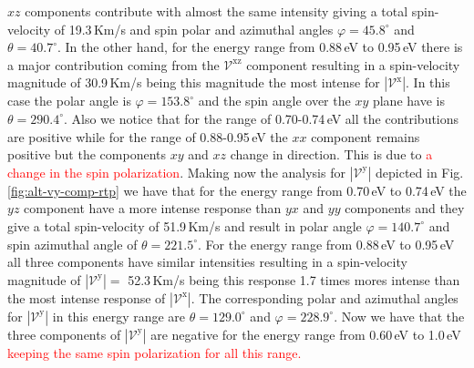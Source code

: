 \documentclass[prb,11pt,tightenlines,twocolumn,aps]{revtex4-1}
\begin{document}
$xz$ components contribute with almost the same intensity giving a total spin-
velocity of 19.3\,Km/s and spin polar and azimuthal angles $\varphi =
45.8^{\circ}$ and $\theta=40.7^{\circ}$.
%
In the other hand, for the energy range from 0.88\,eV to 0.95\,eV there is a
major contribution coming from the $\mathcal{V}^{\mathrm{xz}}$ component
resulting in a spin-velocity magnitude of 30.9\,Km/s being this magnitude the
most intense for $|\mathcal{V}^{\mathrm{x}}|$. In this case the polar angle is
$\varphi=153.8^{\circ}$ and the spin angle over the $xy$ plane have is
$\theta=290.4^{\circ}$.
%
Also we notice that for the range of 0.70-0.74\,eV all the contributions are
positive while for the range of 0.88-0.95\,eV the $xx$ component remains
positive but the components $xy$ and $xz$ change in direction. This is due to
\textcolor{red}{\large a change in the spin polarization}.
Making now the analysis for $|\mathcal{V}^{\mathrm{y}}|$ depicted in Fig.
\ref{fig:alt-vy-comp-rtp} we have that for the energy range from 0.70\,eV to
0.74\,eV the $yz$ component have a more intense response than $yx$ and $yy$
components and they give a total spin-velocity of 51.9\,Km/s and result in polar
angle $\varphi=140.7^{\circ}$ and spin azimuthal angle of
$\theta=221.5^{\circ}$.
%
For the energy range from 0.88\,eV to 0.95\,eV all three components have similar
intensities resulting in a spin-velocity magnitude of
$|\mathcal{V}^{\mathrm{y}}| =$ 52.3\,Km/s being this response 1.7 times mores
intense than the most intense response of $|\mathcal{V}^{\mathrm{x}}|$. The
corresponding polar and azimuthal angles for $|\mathcal{V}^{\mathrm{y}}|$ in
this energy range are $\theta = 129.0 ^{\circ}$ and $\varphi = 228.9 ^{\circ}$.
%
Now we have that the three components of $|\mathcal{V}^{\mathrm{y}}|$ are
negative for the energy range from 0.60\,eV to 1.0\,eV \textcolor{red}{keeping
the same spin polarization for all this range.} 
%
\end{document}
